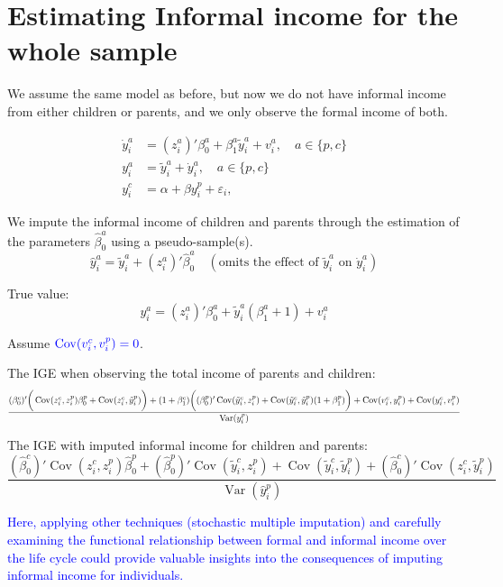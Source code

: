 \documentclass[12pt,oneside]{article}
\theoremstyle{bracket}
\newcommand\scalemath[2]{\scalebox{#1}{\mbox{\ensuremath{\displaystyle #2}}}}
\begin{document}
\section{Estimating Informal income for the whole sample}
We assume the same model as before, but now we do not have informal income from either children or parents, and we only observe the formal income of both.  

\begin{align}
    \dot{y}^a_i &= (z^a_i)' \beta^a_0 + \beta^a_1 \tilde{y}^a_i + v_i^a, \quad a\in \{p,c\}\\
    y^a_i &= \tilde{y}^a_i + \dot{y}^a_i,\quad a\in \{p,c\} \\
    y^c_i &= \alpha + \beta y_i^p + \varepsilon_i,
\end{align}

We impute the informal income of children and parents through the estimation of the parameters $\hat{\beta}_0^a$ using a pseudo-sample(s).
\[
\hat{y}^a_i= \tilde{y}^a_i+(z_i^a)'\hat{\beta}^a_0 
\quad (\text{omits the effect of } \tilde{y}^a_i \text{ on } \dot{y}^a_i)
\]

True value:
\[
y^a_i=(z_i^a)'\beta^a_0+ \tilde{y}^a_i(\beta_1^a+1)+ v^a_i
\]

Assume $\textcolor{blue}{\operatorname{Cov}(v_i^c,v_i^p)=0}$.

The IGE when observing the total income of parents and children:
\[
\scalemath{0.9}{
\frac{(\beta_0^c)'\bigg(\operatorname{Cov}(z_i^c,z_i^p)\beta_0^p+\operatorname{Cov}(z_i^c,\tilde{y}_i^p)\bigg)+(1+\beta_1^c)\bigg((\beta_0^p)'\operatorname{Cov}(\tilde{y}_i^c,z_i^p) +\operatorname{Cov}(\tilde{y}_i^c,\tilde{y}_i^p) (1+\beta_1^p)\bigg) +\operatorname{Cov}(v_i^c,y_i^p)+\operatorname{Cov}(y_i^c,v_i^p)}{\operatorname{Var}(y_i^p)}}
\]

The IGE with imputed informal income for children and parents:
\[
\frac{(\hat{\beta}_0^c)'\operatorname{Cov}(z_i^c,z_i^p)\hat{\beta}_0^p + (\hat{\beta}_0^p)'\operatorname{Cov}(\tilde{y}_i^c,z_i^p)+\operatorname{Cov}(\tilde{y}_i^c,\tilde{y}_i^p)+(\hat{\beta}_0^c)'\operatorname{Cov}(z_i^c,\tilde{y}_i^p)}{\operatorname{Var}(\hat{y}_i^p)}
\]

\textcolor{blue}{Here, applying other techniques (stochastic multiple imputation) and carefully examining the functional relationship between formal and informal income over the life cycle could provide valuable insights into the consequences of imputing informal income for individuals.} 
\end{document}
